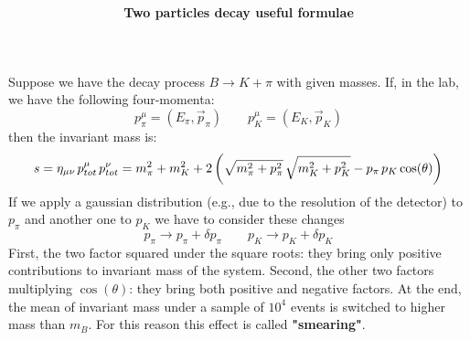 \documentclass[11pt,a4paper]{article}
\begin{document}
\title{
}
\author{\bf{Two particles decay useful formulae}}
\date{}
\maketitle

\noindent
Suppose we have the decay process $B \rightarrow K + \pi$ with given masses.
\newline
If, in the lab, we have the following four-momenta:
\begin{equation*}
    p_\pi^\mu = (E_\pi, \vec{p}_\pi) \qquad p_K^\mu = (E_K, \vec{p}_K)
\end{equation*}
\noindent
then the invariant mass is:
\begin{equation*}
    s = \eta_{\mu\nu} \hspace{0.5mm} p_{tot}^\mu \hspace{0.5mm} p_{tot}^\nu = m_\pi^2 + m_K^2 + 2\left( \sqrt{m_\pi^2 + p_\pi^2}\hspace{0.5mm}\sqrt{m_K^2 + p_K^2} - p_\pi \hspace{0.5mm} p_K\cos(\theta) \right)
\end{equation*}
\noindent
If we apply a gaussian distribution (e.g., due to the resolution of the detector) to $p_\pi$ and another one to $p_K$ we have to consider these changes
\begin{equation*}
    p_\pi \rightarrow p_\pi + \delta p_\pi \qquad p_K \rightarrow p_K + \delta p_K 
\end{equation*}
First, the two factor squared under the square roots: they bring only positive contributions to invariant mass of the system. Second, the other two factors multiplying $\cos(\theta)$: they bring both positive and negative factors.
At the end, the mean of invariant mass under a sample of $10^4$ events is switched to higher mass than $m_B$.
For this reason this effect is called {\bf "smearing"}.
\end{document}
